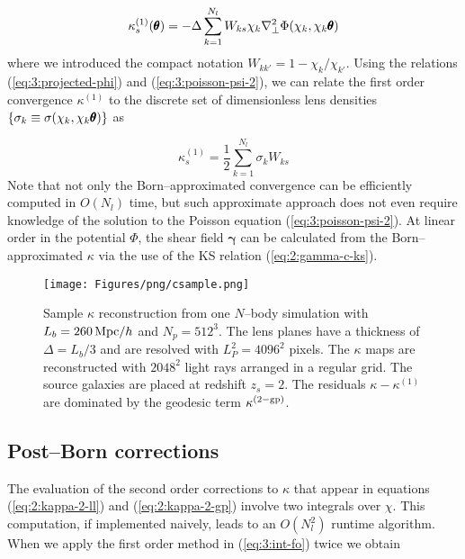 \begin{equation}
\label{eq:3:kappa-fo-num-1}
\kappa^{(1)}_s(\pmb{\theta}) = -\Delta\sum_{k=1}^{N_l} W_{ks}\chi_k\nabla^2_\perp\Phi(\chi_k,\chi_k\pmb{\theta})
\end{equation} 
%
where we introduced the compact notation $W_{kk'}=1-\chi_k/\chi_{k'}$. Using the relations (\ref{eq:3:projected-phi}) and (\ref{eq:3:poisson-psi-2}), we can relate the first order convergence $\kappa^{(1)}$ to the discrete set of dimensionless lens densities $\{\sigma_k\equiv\sigma(\chi_k,\chi_k\pmb{\theta})\}$ as

\begin{equation}
\label{eq:3:kappa-fo-num-2}
\kappa^{(1)}_s = \frac{1}{2}\sum_{k=1}^{N_l} \sigma_k W_{ks}
\end{equation}
%
Note that not only the Born--approximated convergence can be efficiently computed in $O(N_l)$ time, but such approximate approach does not even require knowledge of the solution to the Poisson equation (\ref{eq:3:poisson-psi-2}). At linear order in the potential $\Phi$, the shear field $\pmb{\gamma}$ can be calculated from the Born--approximated $\kappa$ via the use of the KS relation (\ref{eq:2:gamma-c-ks}).  

\begin{figure}
\begin{center}
\texttt{[image: Figures/png/csample.png]}
\end{center}
\caption{Sample $\kappa$ reconstruction from one $N$--body simulation with $L_b=260\,{\rm Mpc}/h$ and $N_p=512^3$. The lens planes have a thickness of $\Delta=L_b/3$ and are resolved with $L_P^2=4096^2$ pixels. The $\kappa$ maps are reconstructed with $2048^2$ light rays arranged in a regular grid. The source galaxies are placed at redshift $z_s=2$. The residuals $\kappa-\kappa^{(1)}$ are dominated by the geodesic term $\kappa^{(2-{\rm gp})}$.}
\label{fig:3:csample}
\end{figure}

\subsection{Post--Born corrections}
The evaluation of the second order corrections to $\kappa$ that appear in equations (\ref{eq:2:kappa-2-ll}) and (\ref{eq:2:kappa-2-gp}) involve two integrals over $\chi$. This computation, if implemented naively, leads to an $O(N_l^2)$ runtime algorithm. When we apply the first order method in (\ref{eq:3:int-fo}) twice we obtain

